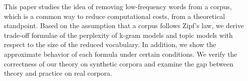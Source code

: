 This paper studies the idea of removing low-frequency words from a corpus, which is a common way to reduce computational costs, from a theoretical standpoint. Based on the assumption that a corpus follows Zipf's law, we derive trade-off formulae of the perplexity of k-gram models and topic models with respect to the size of the reduced vocabulary. In addition, we show the approximate behavior of each formula under certain conditions. We verify the correctness of our theory on synthetic corpora and examine the gap between theory and practice on real corpora.
